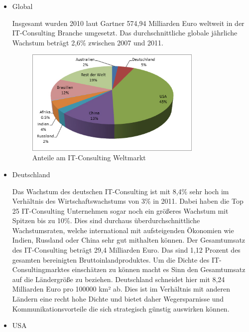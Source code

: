 \begin{itemize} 
\item {Global}

Insgesamt wurden 2010 laut Gartner 574,94 Milliarden Euro weltweit in der IT-Consulting Branche umgesetzt. \cite{itConsultingGlobal} Das durchschnittliche globale jährliche Wachstum beträgt 2,6\% zwischen 2007 und 2011.\cite{globalGartner}

\begin{figure}
  \centering
  \includegraphics[width=0.8\textwidth]{images/global_revenue_share.jpg} 
  \caption{Anteile am IT-Consulting Weltmarkt} \label{fig:weltmarkt} 
\end{figure}


\item {Deutschland}

Das Wachstum des deutschen IT-Consulting ist mit 8,4\% sehr hoch im Verhältnis des Wirtschaftswachstums von 3\% in 2011.\cite{statGer2} Dabei haben die Top 25 IT-Consulting Unternehmen sogar noch ein größeres Wachstum mit Spitzen bis zu 10\%. \cite[6]{topITB} Dies sind durchaus überdurchschnittliche Wachstumsraten, welche international mit aufsteigenden Ökonomien wie Indien, Russland oder China sehr gut mithalten können. Der Gesamtumsatz des IT-Consulting beträgt 29,4 Milliarden Euro.  Das sind 1,12 Prozent des gesamten bereinigten Bruttoinlandproduktes. \cite{statGer} Um die Dichte des IT-Consultingmarktes einschätzen zu können macht es Sinn den Gesamtumsatz auf die Ländergröße zu beziehen. 
Deutschland schneidet hier mit 8,24 Milliarden Euro pro 100000 km² ab. Dies ist im Verhältnis mit anderen Ländern eine recht hohe Dichte und bietet daher Wegersparnisse und Kommunikationsvorteile die sich strategisch günstig auswirken können.

\item {USA}


\end{itemize}
